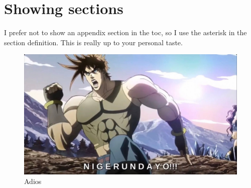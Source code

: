 \section*{Showing sections}\label{showing_sections}
I prefer not to show an appendix section in the toc, so I use the asterisk in the section definition. This is really up to your personal taste.

\begin{figure}[!ht]
    \centering
    \includegraphics[width=\linewidth]{document/appendix/manage_appendix/images/nigerundayo.jpeg}
    \caption{Adios}
    \label{fig:nigerundayo}
\end{figure}

